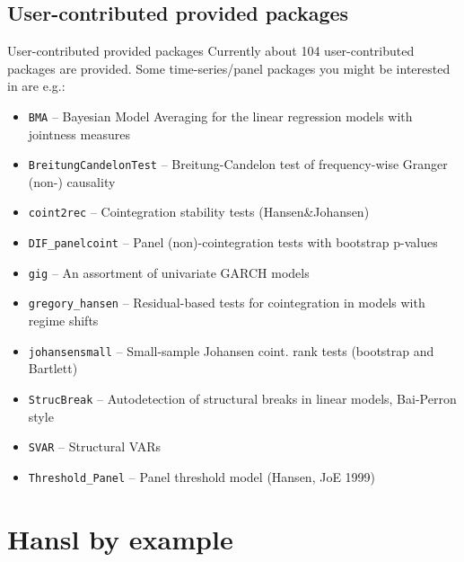 \documentclass{beamer}[11pt]
\begin{document}
\subsection{User-contributed provided packages}

\begin{frame}{User-contributed provided packages}
	Currently about 104 user-contributed packages are provided. Some time-series/panel packages you might be interested in are e.g.:
	\footnotesize
	\begin{itemize}
		\item \texttt{BMA} -- Bayesian Model Averaging for the linear regression models with jointness measures
		\item \texttt{BreitungCandelonTest} -- Breitung-Candelon test of frequency-wise Granger (non-) causality
		\item \texttt{coint2rec} -- Cointegration stability tests (Hansen\&Johansen)
		\item \texttt{DIF\_panelcoint} -- Panel (non)-cointegration tests with bootstrap p-values
		\item \texttt{gig} -- An assortment of univariate GARCH models
		
		\item \texttt{gregory\_hansen} -- Residual-based tests for cointegration in models with regime shifts
		\item \texttt{johansensmall} -- Small-sample Johansen coint. rank tests (bootstrap and Bartlett)
		\item \texttt{StrucBreak} -- Autodetection of structural breaks in linear models, Bai-Perron style
		\item \texttt{SVAR} -- Structural VARs
		\item \texttt{Threshold\_Panel} -- Panel threshold model (Hansen, JoE 1999)
	\end{itemize}
\end{frame}


\section{Hansl by example}
\end{document}

